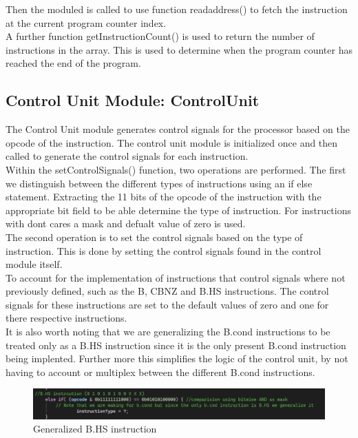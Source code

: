 \documentclass{article}
\begin{document}
Then the moduled is called to use function readaddress() to fetch the instruction at the current program counter index.\\

A further function getInstructionCount() is used to return the number of instructions in the array. This is used to determine when the program counter has reached the end of the program.\\

\subsection{Control Unit Module: ControlUnit}
The Control Unit module generates control signals for the processor based on the opcode of the instruction. The control unit module is initialized once and then called to generate the control signals for each instruction.\\

Within the setControlSignals() function, two operations are performed. The first we distinguish between the different types of instructions using an if else statement. Extracting the 11 bits of the opcode of the instruction with the appropriate bit field to be able determine the type of instruction. For instructions with dont cares a mask and defualt value of zero is used.\\

The second operation is to set the control signals based on the type of instruction. This is done by setting the control signals found in the control module itself.\\

To account for the implementation of instructions that control signals where not previously defined, such as the B, CBNZ and B.HS instructions. The control signals for these instructions are set to the default values of zero and one for there respective instructions.\\

It is also worth noting that we are generalizing the B.cond instructions to be treated only as a B.HS instruction since it is the only present B.cond instruction being implented. Further more this simplifies the logic of the control unit, by not having to account or multiplex between the different B.cond instructions.\\

\begin{figure}[htbp]
    \centering
    \includegraphics[width=1\textwidth]{screen_dumps/B.HSgeneralized.png}
    \caption{Generalized B.HS instruction}
    \label{fig:2}
\end{figure}
\end{document}
